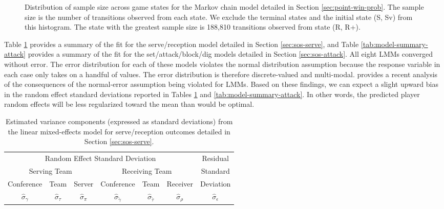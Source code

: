 \documentclass[USenglish]{article}
\theoremstyle{dgthm}
\theoremstyle{dgdef}
\begin{document}
\begin{table}
  \centering
  
  \caption{
    A glossary of the most common attack codes, excluding those which occur with frequency less than 1\%. These 13 common attack codes cover 95\% of attacks, with 15 more attack codes covering the remaining 5\%.
  }
  \label{tab:attack-code}
\end{table}

\begin{figure}
    \centering
    \caption{
      Distribution of sample size across game states for the Markov chain model detailed in Section \ref{sec:point-win-prob}. The sample size is the number of transitions observed from each state. We exclude the terminal states and the initial state (S, Sv) from this histogram. The state with the greatest sample size is 188,810 transitions observed from state (R, R+).
    }
    \label{fig:state-sample-size}
\end{figure}

Table \ref{tab:model-summary-serve} provides a summary of the fit for the serve/reception model detailed in Section \ref{sec:sos-serve}, and Table \ref{tab:model-summary-attack} provides a summary of the fit for the set/attack/block/dig models detailed in Section \ref{sec:sos-attack}. All eight LMMs converged without error. The error distribution for each of these models violates the normal distribution assumption because the response variable in each case only takes on a handful of values. The error distribution is therefore discrete-valued and multi-modal. \textcite{schielzeth_etal_2020} provides a recent analysis of the consequences of the normal-error assumption being violated for LMMs. Based on these findings, we can expect a slight upward bias in the random effect standard deviations reported in Tables \ref{tab:model-summary-serve} and \ref{tab:model-summary-attack}. In other words, the predicted player random effects will be less regularized toward the mean than would be optimal.

\begin{table}
  \centering
  \begin{tabular}{ccc|ccc|c}
    \multicolumn{6}{c}{Random Effect Standard Deviation} & Residual\\
    \multicolumn{3}{c}{Serving Team} & \multicolumn{3}{c}{Receiving Team} & Standard\\
    Conference & Team & Server & Conference & Team & Receiver & Deviation\\
    $\hat\sigma_\gamma$ & $\hat\sigma_\tau$ & $\hat\sigma_\pi$ & $\hat\sigma_{\tilde\gamma}$ & $\hat\sigma_{\tilde\tau}$ & $\hat\sigma_\rho$ & $\hat\sigma_\epsilon$\\
    \hline
    
  \end{tabular}
  \caption{
    Estimated variance components (expressed as standard deviations) from the linear mixed-effects model for serve/reception outcomes detailed in Section \ref{sec:sos-serve}.
  }
  \label{tab:model-summary-serve}
\end{table}
\end{document}
